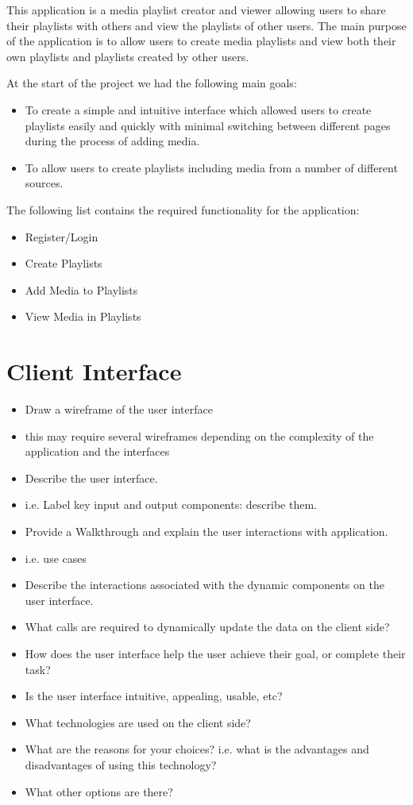 \documentclass{sig-alt-release2}
\begin{document}
This application is a media playlist creator and viewer allowing users to share their playlists with others and view the playlists of other users. The main purpose of the application is to allow users to create media playlists and view both their own playlists and playlists created by other users.

At the start of the project we had the following main goals:
\begin{itemize}
\item To create a simple and intuitive interface which allowed users to create playlists easily and quickly with minimal switching between different pages during the process of adding media.
\item To allow users to create playlists including media from a number of different sources.
\end{itemize}

The following list contains the required functionality for the application:

\begin{itemize}
\item Register/Login
\item Create Playlists
\item Add Media to Playlists
\item View Media in Playlists
\end{itemize} 

\section{Client Interface}
\begin{itemize}
\item	Draw a wireframe of the user interface
\item	this may require several wireframes depending on the complexity of the application and the interfaces
\item	Describe the user interface.
\item	i.e. Label key input and output components: describe them.
\item	Provide a Walkthrough and explain the user interactions with application. 
\item	i.e. use cases
\item	Describe the interactions associated with the dynamic components on the user interface.
\item	What calls are required to dynamically update the data on the client side?
\item	How does the user interface help the user achieve their goal, or complete their task? 
\item	Is the user interface intuitive, appealing, usable, etc?
\item	What technologies are used on the client side? 
\item	What are the reasons for your choices? i.e. what is the advantages and disadvantages of using this technology? 
\item	What other options are there? 
\end{itemize}
\end{document}
